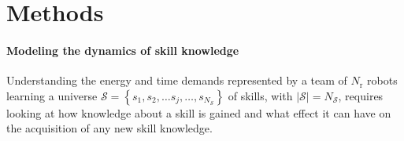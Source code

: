 \documentclass[12pt]{article}
\begin{document}
%
%

\section*{Methods}\label{sec:methods}

\paragraph*{Modeling the dynamics of skill knowledge}\label{sec:knowledge_dynamics_model}
Understanding the energy and time demands represented by a team of $N_\mathrm{r}$ robots learning a universe $\mathcal{S}=\left\lbrace s_1,s_2,\ldots s_j,\ldots, s_{N_\mathcal{S}}\right\rbrace$ of skills, with $|\mathcal{S}| = N_\mathcal{S}$, requires looking at how knowledge about a skill is gained and what effect it can have on the acquisition of any new skill knowledge. 
\end{document}
